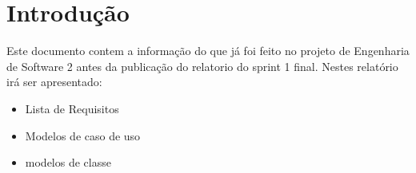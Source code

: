\section{Introdução}
Este documento contem a informação do que já foi feito no projeto de Engenharia de Software 2 antes da publicação do relatorio do sprint 1 final.
Nestes relatório irá ser apresentado:
\begin{itemize}
    \item Lista de Requisitos
    \item Modelos de caso de uso
    \item modelos de classe
\end{itemize}